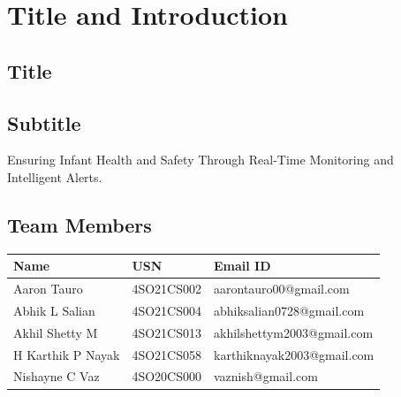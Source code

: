 \documentclass[12pt,a4paper]{report}
\begin{document}
\setlength{\textheight}{0.98\textheight} %
\setlength{\headheight}{30pt} %
\setlength{\footskip}{30pt} %
\fancyhf{} %
\fancyfoot[R]{\thepage} %
\renewcommand{\headrule}{%
  {\color[RGB]{0, 0, 0}\hrule width\headwidth height 2pt} %
  \vspace{0.07\baselineskip}%
  {\color[RGB]{0, 0, 0}\hrule width\headwidth height 0.5pt} %
}
\renewcommand{\footrule}{%

  {\color[RGB]{0,0,0}\hrule width\headwidth height 0.5pt} %
  \vspace{0.07\baselineskip}%
  {\color[RGB]{0,0,0}\hrule width\headwidth height 2pt} %
}


\renewcommand{\baselinestretch}{1.5}

\clearpage
\setcounter{page}{1}
\pagestyle{fancy}

\chapter{Title and Introduction}
\par
\section{Title}
\section{Subtitle}
Ensuring Infant Health and Safety Through Real-Time Monitoring and Intelligent Alerts.
\section{Team Members}
\begin{tabular}{|l|l|l|}
  \hline
  \textbf{Name} & \textbf{USN} & \textbf{Email ID} \\ \hline
  Aaron Tauro       & 4SO21CS002 & aarontauro00@gmail.com \\ \hline
  Abhik L Salian    & 4SO21CS004 & abhiksalian0728@gmail.com \\ \hline
  Akhil Shetty M    & 4SO21CS013 & akhilshettym2003@gmail.com \\ \hline
  H Karthik P Nayak & 4SO21CS058 & karthiknayak2003@gmail.com \\ \hline
  Nishayne C Vaz    & 4SO20CS000 & vaznish@gmail.com \\ \hline
\end{tabular}
\end{document}

